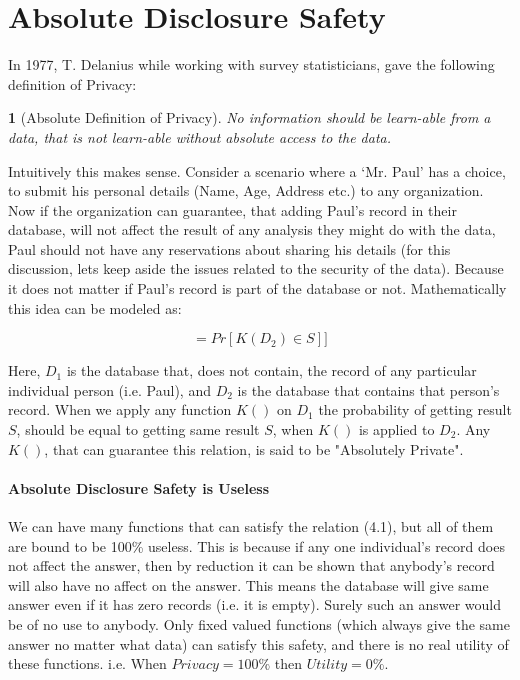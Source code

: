 \documentclass[12pt]{report}
\theoremstyle{named}
\newtheorem*{namedtheorem}{}
\begin{document}
\section{Absolute Disclosure Safety}

In 1977, T. Delanius while working with survey statisticians, gave the following definition of Privacy:
\begin{namedtheorem}[Absolute Definition of Privacy\cite{dalenius1977}]
No information should be learn-able from a data, that is not learn-able without absolute access to the data.
\end{namedtheorem}



Intuitively this makes sense. Consider a scenario where a `Mr. Paul' has a choice, to submit his personal details (Name, Age, Address etc.) to any organization.  Now if the organization can guarantee, that adding Paul's record in their database, will not affect the result of any analysis they might do with the data, Paul should not have any reservations about sharing his details (for this discussion, lets keep aside the issues related to the security of the data). Because it does not matter if Paul's record is part of the database or not. Mathematically this idea can be modeled as:

\begin{equation}
[Pr[\mathit{K}(D_{1})\in S]  = Pr[\mathit{K}(D_{2})\in S]]
\end{equation}

Here, $D_{1}$ is the database that, does not contain, the record of any particular individual person (i.e. Paul), and  $D_{2}$ is the database that contains that person's record. When we apply any function $K()$ on  $D_{1}$ the probability of getting result $S$, should be equal to getting same result $S$, when $K()$ is applied to $D_{2}$. Any $K()$, that can guarantee this relation, is said to be "Absolutely Private".

\paragraph{Absolute Disclosure Safety is Useless\\}
We can have many functions that can satisfy the relation (4.1), but all of them are bound to be 100\% useless. This is because if any one individual's record does not affect the answer, then by reduction it can be shown that anybody's record will also have no affect on the answer. This means the database will give same answer even if it has zero records (i.e. it is empty). Surely such an answer would be of no use to anybody. Only fixed valued functions (which always give the same answer no matter what data) can satisfy this safety, and there is no real utility of these functions. i.e. When $Privacy = 100\%$ then $Utility = 0\%$.
\end{document}
